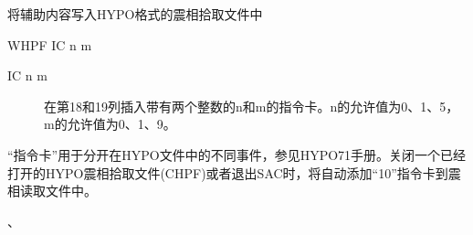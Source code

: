 \label{cmd:whpf}

将辅助内容写入HYPO格式的震相拾取文件中

\begin{SACSTX}
WHPF IC n m
\end{SACSTX}

\begin{description}
\item [IC n m]  在第18和19列插入带有两个整数的n和m的指令卡。n的允许值为0、1、5，m的允许值为0、1、9。
\end{description}

``指令卡''用于分开在HYPO文件中的不同事件，参见HYPO71手册。关闭一个已经打开的HYPO震相拾取文件(CHPF)或者退出SAC时，将自动添加``10''指令卡到震相读取文件中。

、
